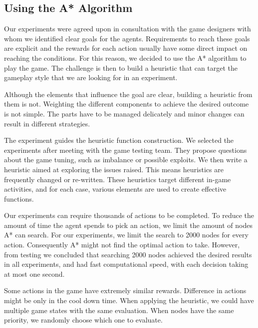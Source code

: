 \documentclass[letterpaper]{article} %
\begin{document}
\subsection{Using the A* Algorithm}

Our experiments were agreed upon in consultation with the game designers with whom we identified clear goals for the agents. Requirements to reach these goals are explicit and the rewards for each action usually have some direct impact on reaching the conditions. For this reason, we decided to use the A* algorithm to play the game. The challenge is then to build a heuristic that can target the gameplay style that we are looking for in an experiment.

Although the elements that influence the goal are clear, building a heuristic from them is not. Weighting the different components to achieve the desired outcome is not simple. The parts have to be managed delicately and minor changes can result in different strategies.

The experiment guides the heuristic function construction. We selected the experiments after meeting with the game testing team. They propose questions about the game tuning, such as imbalance or possible exploits. We then write a heuristic aimed at exploring the issues raised. This means heuristics are frequently changed or re-written. These heuristics target different in-game activities, and for each case, various elements are used to create effective functions.

Our experiments can require thousands of actions to be completed. To reduce the amount of time the agent spends to pick an action, we limit the amount of nodes A* can search. For our experiments, we limit the search to 2000 nodes for every action. Consequently A* might not find the optimal action to take. However, from testing we concluded that searching 2000 nodes achieved the desired results in all experiments, and had fast computational speed, with each decision taking at most one second.

Some actions in the game have extremely similar rewards. Difference in actions might be only in the cool down time. When applying the heuristic, we could have multiple game states with the same evaluation.
When nodes have the same priority, we randomly choose which one to evaluate.
\end{document}
